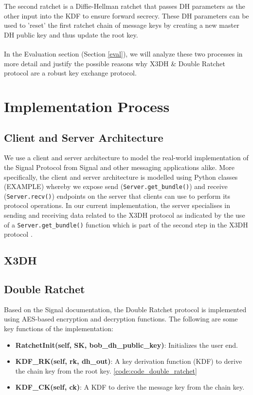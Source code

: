 \documentclass[11pt]{article}
\begin{document}
The second ratchet is a Diffie-Hellman ratchet that passes DH parameters as the other input into the KDF to ensure forward secrecy. These DH parameters can be used to 'reset' the first ratchet chain of message keys by creating a new master DH public key and thus update the root key.
\\\\
In the Evaluation section (Section \ref{eval}), we will analyze these two processes in more detail and justify the possible reasons why X3DH \& Double Ratchet protocol are a robust key exchange protocol.

\section{Implementation Process}

\subsection{Client and Server Architecture}
We use a client and server architecture to model the real-world implementation of the Signal Protocol from Signal and other messaging applications alike. More specifically, the client and server architecture is modelled using Python classes (EXAMPLE) whereby we expose send (\texttt{Server.get\_bundle()}) and receive (\texttt{Server.recv()}) endpoints on the server that clients can use to perform its protocol operations. In our current implementation, the server specialises in sending and receiving data related to the X3DH protocol as indicated by the use of a \texttt{Server.get\_bundle()} function which is part of the second step in the X3DH protocol \cite{}.

\subsection{X3DH}

\subsection{Double Ratchet}
Based on the Signal documentation, the Double Ratchet protocol is implemented using AES-based encryption and decryption functions. The following are some key functions of the implementation:

\begin{itemize}
    \item \textbf{RatchetInit(self, SK, bob\_dh\_public\_key)}: Initializes the user end.
    \item \textbf{KDF\_RK(self, rk, dh\_out)}: A key derivation function (KDF) to derive the chain key from the root key. \autoref{code:code_double_ratchet}

    \item \textbf{KDF\_CK(self, ck)}: A KDF to derive the message key from the chain key.
\end{itemize}
\end{document}
